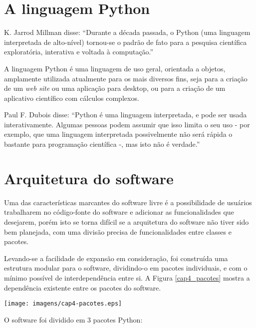 \section{A linguagem Python}

    K. Jarrod Millman disse: ``Durante a década passada, o Python (uma linguagem interpretada
    de alto-nível) tornou-se o padrão de fato para a pesquisa científica
    exploratória, interativa e voltada à computação.'' \cite{5725235}
    
    A linguagem Python \cite{Python} é uma linguagem de uso geral, orientada a objetos,
    amplamente utilizada atualmente para os mais diversos fins, seja para a criação de um
    \textit{web site} ou uma aplicação para desktop, ou para a criação de um aplicativo
    científico com cálculos complexos.
    
    Paul F. Dubois disse: ``Python é uma linguagem interpretada, e pode ser usada interativamente.
    Algumas pessoas podem assumir que isso limita o seu uso - por exemplo,
    que uma linguagem interpretada possivelmente não será rápida o bastante
    para programação científica -, mas isto não é verdade.'' \cite{4160249}

\section{Arquitetura do software}

    Uma das características marcantes do software livre é a possibilidade de
    usuários trabalharem no código-fonte do software e adicionar as funcionalidades
    que desejarem, porém isto se torna difícil se a arquitetura do software não tiver
    sido bem planejada, com uma divisão precisa de funcionalidades entre classes e
    pacotes.

    Levando-se a facilidade de expansão em consideração, foi construída uma estrutura
    modular para o software, dividindo-o em pacotes individuais, e com o mínimo
    possível de interdependência entre si. A Figura \ref{cap4_pacotes} mostra a
    dependência existente entre os pacotes do software.
    
    \begin{center}
        \texttt{[image: imagens/cap4-pacotes.eps]}
	\label{cap4_pacotes}
    \end{center}
    
    O software foi dividido em 3 pacotes Python:

